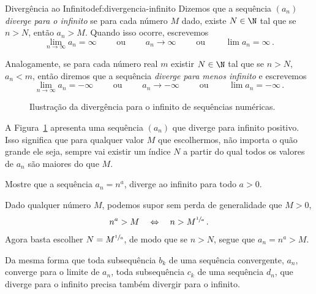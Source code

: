 \begin{definicao}{Divergência ao Infinito}{def:divergencia-infinito}
  Dizemos que a sequência $(a_n)$ \emph{diverge para o infinito} se para cada número $M$ dado,
  existe $N\in\N$ tal que se $n>N$, então $a_n>M$.
  Quando isso ocorre, escrevemos
  \[ \lim_{n\to\infty} a_n=\infty
  \qquad\text{ ou }\qquad
  a_n\to \infty
  \qquad\text{ ou }\qquad
  \lim a_n=\infty   \,.
  \]

  Analogamente, se para cada número real $m$ existir $N\in \N$ tal que se $n>N$, $a_n<m$,
  então diremos que a sequência \emph{diverge para menos infinito} e escrevemos
  \[
  \lim_{n\to\infty} a_n=-\infty
  \qquad\text{ ou }\qquad
  a_n\to-\infty
  \qquad\text{ ou }\qquad
  \lim a_n=-\infty \,.
  \]
\end{definicao}

\begin{figure}
  \centering
  \vspace{0.5\baselineskip}
  
  \caption{Ilustração da divergência para o infinito de sequências numéricas.}
  \label{fig:sequencia_infinity}
\end{figure}

A Figura~\ref{fig:sequencia_infinity} apresenta uma sequência $(a_n)$ que
diverge para infinito positivo. Isso significa que para qualquer valor $M$
que escolhermos, não importa o quão grande ele seja, sempre vai existir um
índice $N$ a partir do qual todos os valores de $a_n$ são maiores do que $M$.

\begin{example}
  Mostre que a sequência $a_n=n^a$, diverge ao infinito para todo $a>0$.

  \solution
  Dado qualquer número $M$, podemos supor sem perda de generalidade que $M>0$,
  \[
  n^a > M \quad \Leftrightarrow \quad n > M^{\sfrac{1}{a}}  \,.
  \]
  Agora basta escolher $N=M^{\sfrac{1}{a}}$, de modo que se $n>N$, segue que $a_n=n^a>M$.
\end{example}

Da mesma forma que toda subsequência $b_k$ de uma sequência convergente, $a_n$,
converge para o limite de $a_n$, toda subsequência $c_k$ de uma sequência $d_n$, que
diverge para o infinito precisa também divergir para o infinito.

\clearpage

